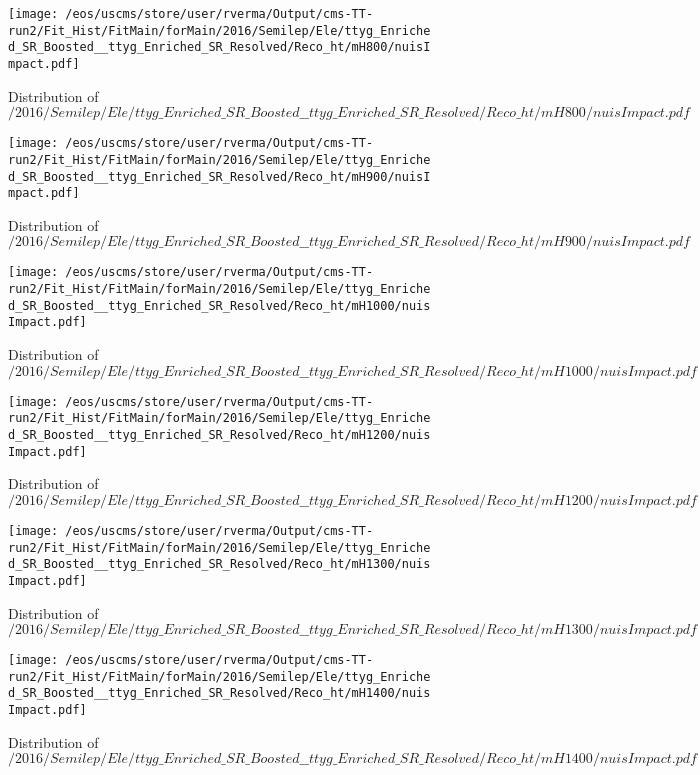 \begin{figure}
\centering
\texttt{[image: /eos/uscms/store/user/rverma/Output/cms-TT-run2/Fit\_Hist/FitMain/forMain/2016/Semilep/Ele/ttyg\_Enriched\_SR\_Boosted\_\_ttyg\_Enriched\_SR\_Resolved/Reco\_ht/mH800/nuisImpact.pdf]}
\caption{Distribution of $/2016/Semilep/Ele/ttyg\_Enriched\_SR\_Boosted\_\_ttyg\_Enriched\_SR\_Resolved/Reco\_ht/mH800/nuisImpact.pdf$}
\end{figure}

\begin{figure}
\centering
\texttt{[image: /eos/uscms/store/user/rverma/Output/cms-TT-run2/Fit\_Hist/FitMain/forMain/2016/Semilep/Ele/ttyg\_Enriched\_SR\_Boosted\_\_ttyg\_Enriched\_SR\_Resolved/Reco\_ht/mH900/nuisImpact.pdf]}
\caption{Distribution of $/2016/Semilep/Ele/ttyg\_Enriched\_SR\_Boosted\_\_ttyg\_Enriched\_SR\_Resolved/Reco\_ht/mH900/nuisImpact.pdf$}
\end{figure}

\begin{figure}
\centering
\texttt{[image: /eos/uscms/store/user/rverma/Output/cms-TT-run2/Fit\_Hist/FitMain/forMain/2016/Semilep/Ele/ttyg\_Enriched\_SR\_Boosted\_\_ttyg\_Enriched\_SR\_Resolved/Reco\_ht/mH1000/nuisImpact.pdf]}
\caption{Distribution of $/2016/Semilep/Ele/ttyg\_Enriched\_SR\_Boosted\_\_ttyg\_Enriched\_SR\_Resolved/Reco\_ht/mH1000/nuisImpact.pdf$}
\end{figure}

\begin{figure}
\centering
\texttt{[image: /eos/uscms/store/user/rverma/Output/cms-TT-run2/Fit\_Hist/FitMain/forMain/2016/Semilep/Ele/ttyg\_Enriched\_SR\_Boosted\_\_ttyg\_Enriched\_SR\_Resolved/Reco\_ht/mH1200/nuisImpact.pdf]}
\caption{Distribution of $/2016/Semilep/Ele/ttyg\_Enriched\_SR\_Boosted\_\_ttyg\_Enriched\_SR\_Resolved/Reco\_ht/mH1200/nuisImpact.pdf$}
\end{figure}

\begin{figure}
\centering
\texttt{[image: /eos/uscms/store/user/rverma/Output/cms-TT-run2/Fit\_Hist/FitMain/forMain/2016/Semilep/Ele/ttyg\_Enriched\_SR\_Boosted\_\_ttyg\_Enriched\_SR\_Resolved/Reco\_ht/mH1300/nuisImpact.pdf]}
\caption{Distribution of $/2016/Semilep/Ele/ttyg\_Enriched\_SR\_Boosted\_\_ttyg\_Enriched\_SR\_Resolved/Reco\_ht/mH1300/nuisImpact.pdf$}
\end{figure}

\begin{figure}
\centering
\texttt{[image: /eos/uscms/store/user/rverma/Output/cms-TT-run2/Fit\_Hist/FitMain/forMain/2016/Semilep/Ele/ttyg\_Enriched\_SR\_Boosted\_\_ttyg\_Enriched\_SR\_Resolved/Reco\_ht/mH1400/nuisImpact.pdf]}
\caption{Distribution of $/2016/Semilep/Ele/ttyg\_Enriched\_SR\_Boosted\_\_ttyg\_Enriched\_SR\_Resolved/Reco\_ht/mH1400/nuisImpact.pdf$}
\end{figure}

